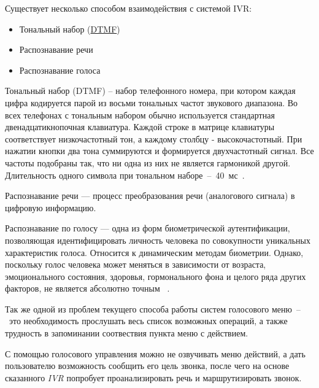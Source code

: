 Существует несколько способом взаимодействия с системой IVR:
\begin{itemize}
    \item Тональный набор (\hyperlink{dtmf}{DTMF})
    \item Распознавание речи
    \item Распознавание голоса
\end{itemize}

Тональный набор (DTMF) -- набор телефонного номера, при котором каждая цифра кодируется
парой из восьми тональных частот звукового диапазона. Во всех телефонах с
тональным набором обычно используется стандартная двенадцатикнопочная клавиатура.
Каждой строке в матрице клавиатуры соответствует низкочастотный тон, а каждому
столбцу - высокочастотный. При нажатии кнопки два тона суммируются и формируется
двухчастотный сигнал. Все частоты подобраны так, что ни одна из них не является
гармоникой другой. Длительность одного символа при тональном наборе~--~40~мс~\cite{dtmf}.

Распознавание речи — процесс преобразования речи (аналогового сигнала) в цифровую информацию.

Распознавание по голосу — одна из форм биометрической аутентификации, позволяющая
идентифицировать личность человека по совокупности уникальных характеристик голоса.
Относится к динамическим методам биометрии. Однако, поскольку голос человека может
меняться в зависимости от возраста, эмоционального состояния, здоровья,
гормонального фона и целого ряда других факторов, не является абсолютно точным~
\cite{recognize_voice}.

Так же одной из проблем текущего способа работы систем голосового меню~--~это
необходимость прослушать весь список возможных операций, а также трудность в
запоминании соотвествия пункта меню с действием.

С помощью голосового управления можно не озвучивать меню действий, а дать
пользователю возможность сообщить его цель звонка, после чего на основе
сказанного \textit{IVR} попробует проанализировать речь и маршрутизировать звонок.
